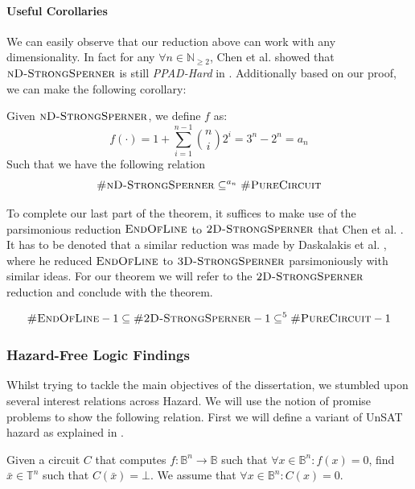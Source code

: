 \paragraph*{Useful Corollaries}
We can easily observe that our reduction above can work with any dimensionality.
In fact for any $\forall n \in \mathbb{N}_{\geq 2}$, Chen et al. showed that
$\textsc{nD-StrongSperner}$ is still \textit{PPAD-Hard} in \cite{chen_SettlingComplexityComputing_2009}. Additionally based on our proof, 
we can make the following corollary:

\begin{corollary}
Given $\textnormal{\textsc{nD-StrongSperner}}$, we define $f$ as:
$$
f(\cdot) = 1 + \sum_{i = 1}^{n - 1}\binom{n}{i}2^i = 3^n - 2^n = a_n
$$
Such that we have the following relation
$$
\textnormal{\textsc{\#nD-StrongSperner}} \subseteq^{a_n} \textnormal{\textsc{\#PureCircuit}}
$$
\end{corollary}

To complete our last part of the theorem, it suffices to make use
of the parsimonious reduction $\textsc{EndOfLine}$  to $\textsc{2D-StrongSperner}$ that Chen et al. \cite{chen_SettlingComplexityComputing_2009}.
It has to be denoted that a similar reduction was made by
Daskalakis et al. \cite{daskalakis_ComplexityComputingNash_2006}, where
he reduced $\textsc{EndOfLine}$ to $\textsc{3D-StrongSperner}$ parsimoniously
with similar ideas.
For our theorem we will refer to the $\textsc{2D-StrongSperner}$ reduction and
conclude with the theorem.


\begin{theorem}
$$
\textnormal{\textsc{\#EndOfLine}} -1 \subseteq \textnormal{\textsc{\#2D-StrongSperner}} -1 \subseteq^5 \textnormal{\textsc{\#PureCircuit}} -1
$$
\end{theorem}

\subsubsection{Hazard-Free Logic Findings}

Whilst trying to tackle the main objectives of the dissertation, we stumbled upon
several interest relations across Hazard. We will use the notion of
promise problems to show the following relation. First we will
define a variant of UnSAT hazard as explained in \cite{ikenmeyer_ComplexityHazardfreeCircuits_2019}.

\begin{definition}
    Given a circuit $C$ that computes $f : \mathbb{B}^n \to \mathbb{B}$ such that
    $\forall x \in \mathbb{B}^n : f(x) = 0$, find $\bar{x} \in \mathbb{T}^n$ such that
    $C(\bar{x}) = \bot$. We assume that $\forall x \in \mathbb{B}^n: C(x) = 0$.
\end{definition}

